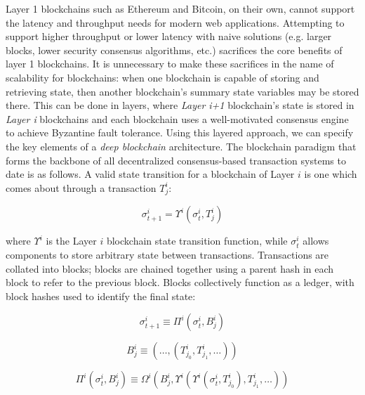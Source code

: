 \documentclass{article}
\newcommand{\block}[2]{B^{#1}_{#2}}
\newcommand{\blockchainstatetransition}[1]{\Upsilon^{i}}
\newcommand{\blockfinalizationstatetransition}[1]{\Omega^#1}
\newcommand{\blockstatetransition}[1]{\Pi^#1}
\newcommand{\statetransition}[2]{\sigma_{#2}^#1}
\newcommand{\transaction}[2]{T_{#2}^#1}
\begin{document}
Layer 1 blockchains such as Ethereum and Bitcoin, on their own, cannot support the latency and throughput needs for modern web applications.  Attempting to support higher throughput or lower latency with naive solutions (e.g. larger blocks, lower security consensus algorithms, etc.) sacrifices the core benefits of layer 1 blockchains.   It is unnecessary to make these sacrifices in the name of scalability for blockchains:  when one blockchain is capable of storing and retrieving state, then another blockchain's summary state variables may be stored there.  This can be done in layers, where {\em Layer i+1} blockchain's state is stored in {\em Layer i} blockchains and each blockchain uses a well-motivated consensus engine to achieve Byzantine fault tolerance.  
Using this layered approach, we can specify the key elements of a {\em deep blockchain} architecture.  The blockchain paradigm \cite{wood2015} that forms the backbone of all decentralized consensus-based transaction systems to date is as follows. A valid state transition for a blockchain of Layer $i$ is one which comes about through a transaction $\transaction{i}{j}$:

\begin{equation}
\statetransition{i}{t+1} = \blockchainstatetransition{i}(\statetransition{i}{t}, \transaction{i}{j})
\end{equation}

\noindent where $\blockchainstatetransition{i}$ is the Layer $i$ blockchain state transition function, while $\statetransition{i}{t}$ allows  components to store arbitrary state between transactions.  Transactions are collated into blocks; blocks are chained together using a parent hash in each block to refer to the previous block.  Blocks collectively function as a ledger, with block hashes used to identify the final state:

\begin{equation}
    \statetransition{i}{t+1} \equiv \blockstatetransition{i}(\statetransition{i}{t}, \block{i}{j})
\end{equation}

\begin{equation}
    \block{i}{j} 	\equiv (\ldots, (\transaction{i}{j_0}, \transaction{i}{j_1}, \ldots))
\end{equation}

\begin{equation}
   \blockstatetransition{i}(\statetransition{i}{t}, \block{i}{j}) 	\equiv \blockfinalizationstatetransition{i}(\block{i}{j}, \blockchainstatetransition{i}(\blockchainstatetransition{i}(\statetransition{i}{t}, \transaction{i}{j_0}), \transaction{i}{j_1}, \ldots))
\end{equation}
\end{document}
